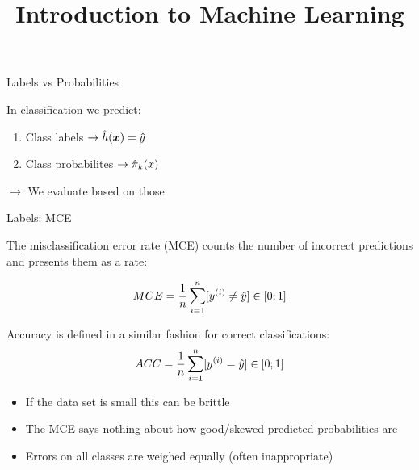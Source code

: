 \documentclass[11pt,compress,t,notes=noshow, xcolor=table]{beamer}
\title{Introduction to Machine Learning}
\institute{\href{https://compstat-lmu.github.io/lecture_i2ml/}{compstat-lmu.github.io/lecture\_i2ml}}
\date{}
\begin{document}














\begin{vbframe}{Labels vs Probabilities}

\lz
In classification we predict:

\lz
\begin{enumerate}
\item Class labels $\rightarrow \hat{h}(\bm{x}) = \hat{y}$
\item Class probabilites $\rightarrow \hat \pi_k(x)$
\end{enumerate}

\lz
$\rightarrow$ We evaluate based on those


\end{vbframe}

\begin{vbframe}{Labels: MCE}

The misclassification error rate (MCE) counts the number of incorrect predictions and presents them as a rate:

\[
MCE = \frac{1}{n} \sum_{i=1}^n [y^{(i)} \neq \hat{y}] \in [0;1]
\]

Accuracy is defined in a similar fashion for correct classifications:
\[
ACC = \frac{1}{n} \sum_{i=1}^n [y^{(i)} = \hat{y}] \in [0;1]
\]

\begin{itemize}
\item If the data set is small this can be brittle
\item The MCE says nothing about how good/skewed predicted probabilities are
\item Errors on all classes are weighed equally (often inappropriate)
\end{itemize}
\end{vbframe}
\end{document}
